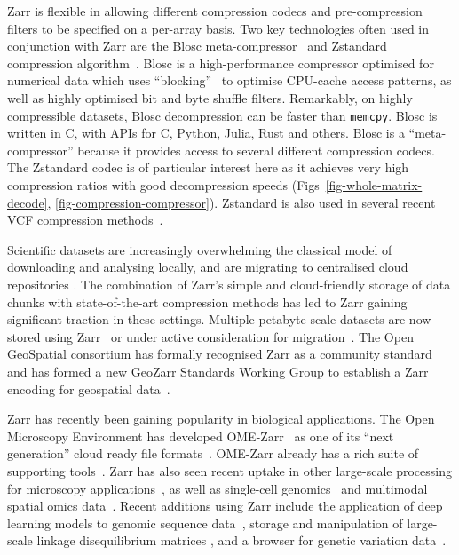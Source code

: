 \documentclass[a4paper,num-refs]{oup-contemporary}
\begin{document}
Zarr is flexible in allowing different compression codecs and
pre-compression filters to be specified on a per-array basis.
Two key technologies often used in conjunction with Zarr are the Blosc
meta-compressor~\cite{alted2010modern}
and Zstandard compression algorithm~\citep{collet2021rfc}.
Blosc is a high-performance compressor optimised for numerical
data which uses ``blocking''~\citep{alted2010modern} to
optimise CPU-cache access patterns, as well as highly optimised
bit and byte shuffle filters.  Remarkably, on highly
compressible datasets, Blosc decompression can be faster
than \texttt{memcpy}.
Blosc is written in C, with APIs for C, Python, Julia, Rust
and others.
Blosc is a ``meta-compressor'' because it provides
access to several different compression codecs. The
Zstandard codec is of particular
interest here as it achieves very high compression ratios
with good decompression speeds (Figs~\ref{fig-whole-matrix-decode},
\ref{fig-compression-compressor}).
Zstandard is also used in several recent VCF compression
methods~\citep[e.g.][]{lefaive2021sparse,wertenbroek2022xsi}.

Scientific datasets are increasingly overwhelming the classical
model of downloading and analysing locally, and are migrating to
centralised cloud repositories \citep{abernathey2021cloud,moore2021ome}.
The combination of Zarr's simple and cloud-friendly storage
of data chunks with state-of-the-art compression methods has
led to Zarr gaining significant traction in these settings.
Multiple petabyte-scale datasets are now stored using
Zarr~\cite[e.g.][]{gowan2022using, %
fahnestock2023mappin, %
cmip6_dataset}
or under active consideration for migration~\citep{durbin2020task,abernathey2021opening}.
The Open GeoSpatial consortium has formally recognised Zarr as a community
standard~\cite{ogc_zarr2_standard}
and has formed
a new GeoZarr Standards Working Group to establish a Zarr encoding for
geospatial data~\cite{ogc_geozarr_news}.

Zarr has recently been gaining popularity in biological applications.
The Open Microscopy Environment has developed OME-Zarr~\cite{moore2023ome} as one
of its ``next generation'' cloud ready file formats~\citep{moore2021ome}.
OME-Zarr already has a rich suite of supporting
tools~\cite{moore2023ome,rzepka2023toward}.
Zarr has also seen recent uptake in other large-scale processing for
microscopy applications~\citep{ruan2024image}, as well as
single-cell genomics~\citep{dhapola2022scarf,virshup2023scverse}
and multimodal spatial omics
data~\citep{marconato2024spatialdata,baker2023emobject}.
Recent additions using Zarr include the application of deep learning
models to genomic sequence data~\citep{klie2023predictive}, storage and
manipulation of large-scale linkage disequilibrium matrices \cite{zabad2023fast},
and a browser for genetic variation data~\citep{konig2023divbrowse}.
\end{document}
